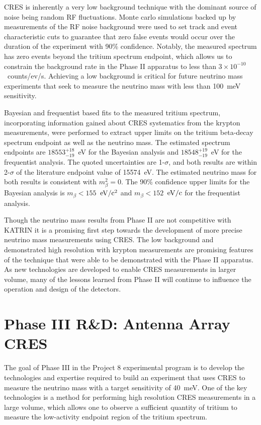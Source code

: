 CRES is inherently a very low background technique with the dominant source of noise being random RF fluctuations. Monte carlo simulations backed up by measurements of the RF noise background were used to set track and event characteristic cuts to guarantee that zero false events would occur over the duration of the experiment with 90\% confidence. Notably, the measured spectrum has zero events beyond the tritium spectrum endpoint, which allows us to constrain the background rate in the Phase II apparatus to less than $3\times10^{-10}$~counts/ev/s. Achieving a low background is critical for future neutrino mass experiments that seek to measure the neutrino mass with less than 100~meV sensitivity.

Bayesian and frequentist based fits to the measured tritium spectrum, incorporating information gained about CRES systematics from the krypton measurements, were performed to extract upper limits on the tritium beta-decay spectrum endpoint as well as the neutrino mass. The estimated spectrum endpoints are $18553^{+18}_{-19}$~eV for the Bayesian analysis and $18548^{+19}_{-19}$~eV for the frequentist analysis. The quoted uncertainties are 1-$\sigma$, and both results are within 2-$\sigma$ of the literature endpoint value of 15574~eV. The estimated neutrino mass for both results is consistent with $m_\beta^2=0$. The 90\% confidence upper limits for the Bayesian analysis is $m_\beta < 155$~$\rm{eV}/\rm{c}^2$ and $m_\beta < 152$~$\rm{eV}/\rm{c}$ for the frequentist analysis.

Though the neutrino mass results from Phase II are not competitive with KATRIN it is a promising first step towards the development of more precise neutrino mass measurements using CRES. The low background and demonstrated high resolution with krypton measurements are promising features of the technique that were able to be demonstrated with the Phase II apparatus. As new technologies are developed to enable CRES measurements in larger volume, many of the lessons learned from Phase II will continue to influence the operation and design of the detectors.

\section{Phase III R\&D: Antenna Array CRES}
\label{sec:chap3-phaseIII-antenna-arrays}

The goal of Phase III in the Project 8 experimental program is to develop the technologies and expertise required to build an experiment that uses CRES to measure the neutrino mass with a target sensitivity of 40~meV. One of the key technologies is a method for performing high resolution CRES measurements in a large volume, which allows one to observe a sufficient quantity of tritium to measure the low-activity endpoint region of the tritium spectrum. 

